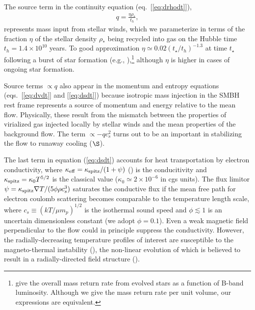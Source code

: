 \documentclass[usenatbib,fleqn]{mn2e}
\newcommand{\rhostar}{\rho_*}
\renewcommand{\th}{t_h}
\begin{document}
The source term in the continuity equation (eq.~[\ref{eq:drhodt}]),
\begin{align}
  q=\frac{\eta \rhostar}{\th},
\label{eq:q}
\end{align}
represents mass input from stellar winds, which we parameterize in
terms of the fraction $\eta$ of the stellar density $\rhostar$ being
recycled into gas on the Hubble time $\th = 1.4 \times 10^{10}$
years.  To good approximation $\eta\simeq 0.02 (t_{\star}/t_h)^{-1.3}$ at time $t_{\star}$ following a burst of star formation (e.g., \citealt{Ciotti+91}),\footnote{\citet{Ciotti+91} give the overall mass return rate from evolved stars as a function of B-band luminosity.  Although we give the mass return rate per unit volume, our expressions are equivalent.} although $\eta$ is higher in cases of ongoing star formation.  

Source terms $\propto q$ also appear in the momentum and entropy equations (eqs.~[\ref{eq:dvdt}] and [\ref{eq:dsdt}]) because isotropic mass injection in the SMBH rest frame represents a source of momentum and energy relative to the mean flow.  Physically, these result from the mismatch between the properties of virialized gas injected locally by stellar winds and the mean properties of the background flow.   The term $\propto -q c_{s}^{2}$ turns out to be an important in stabilizing the flow to runaway cooling ($\S$).

The last term in equation (\ref{eq:dsdt}) accounts for heat transportation by electron conductivity, where $\kappa_{\rm eff}=\kappa_{\rm spitz}/(1+\psi)$ (\citealt{DaltonBalbus:1993a}) is the conducitivity and $\kappa_{\rm spitz} = \kappa_0 T^{5/2}$ is the classical \citet{Spitzer62} value ($\kappa_0\simeq 2\times 10^{-6}$ in cgs units).  The flux limitor $\psi = \kappa_{\rm spitz} \nabla T/(5\phi \rho c_s^3)$ saturates the conductive flux if the mean free path for electron coulomb scattering becomes comparable to the temperature length scale, where $c_s \equiv (kT/\mu m_p)^{1/2}$ is the isothermal sound speed and $\phi \lesssim 1$ is an uncertain dimensionless constant (we adopt $\phi = 0.1$).  Even a weak magnetic field perpendicular to the flow could in principle suppress the conductivity.  However, the radially-decreasing temperature profiles of interest are susceptible to the magneto-thermal instability (\citealt{Balbus01}), the non-linear evolution of which is believed to result in a radially-directed field structure (\citealt{Parrish&Stone07}).
\end{document}

